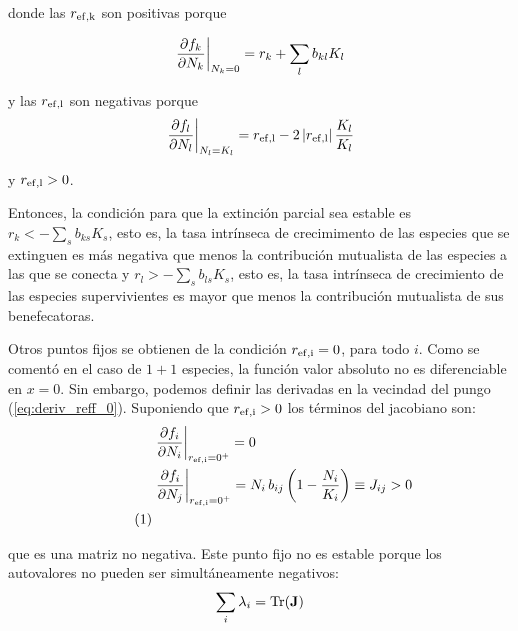 \noindent donde las $r_{\rm{ef},k}$ son positivas porque

\begin{equation}
\displaystyle
\left.\frac{\partial f_k}{\partial N_k} \right|_{N_k=0} = r_k + \sum_{l}b_{kl}K_l\\
\label{eq:partial_N_0}
\end{equation}

\noindent y las $r_{\rm{ef},l}$ son negativas porque
\begin{equation}
\displaystyle
\left.\frac{\partial f_l}{\partial N_l} \right|_{N_l=K_l} = r_{\rm{ef},l} - 2 \left| r_{\rm{ef},l} \right| \frac{K_l}{K_l} \\
\label{eq:partial_N_K}
\end{equation}

\noindent y $r_{\rm{ef},l}>0$.

Entonces, la condición para que la extinción parcial sea estable es $r_k<-\sum_{s}b_{ks}K_s$, esto es, la tasa intrínseca de crecimimento de las especies que se extinguen es más negativa que menos la contribución mutualista de las especies a las que se conecta y $r_l>-\sum_{s}b_{ls}K_s$, esto es, la tasa intrínseca de crecimiento de las especies supervivientes es mayor que menos la contribución mutualista de sus benefecatoras.

Otros puntos fijos se obtienen de la condición $r_{\rm{ef},i}=0$, para todo $i$. Como se comentó en el caso de $1+1$ especies, la función valor absoluto no es diferenciable en $x=0$. Sin embargo, podemos definir las derivadas en la vecindad del pungo (\ref{eq:deriv_reff_0}). Suponiendo que $r_{\rm{ef},i}>0$ los términos del jacobiano son:
\begin{align*}
\displaystyle
&\left.\frac{\partial f_i}{\partial N_i} \right|_{r_{\rm{ef},i}=0^{+}} =0\\
&\left.\frac{\partial f_i}{\partial N_j} \right|_{r_{\rm{ef},i}=0^{+}} =N_i\,b_{ij} \left( 1- \frac{N_i}{K_i} \right) \equiv J_{ij}>0\\
\stepcounter{equation}\tag{\theequation}
\label{eq:partial_N_0}
\end{align*}

\noindent que es una matriz no negativa. Este punto fijo no es estable porque los autovalores no pueden ser simultáneamente negativos:
\begin{equation}
\displaystyle
  \sum_i \lambda_i = \rm{Tr} (\mathbf{J})
\end{equation}

